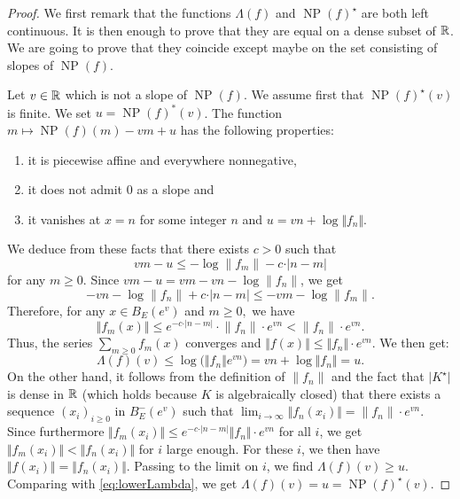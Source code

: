 \documentclass{lms}
\DeclareMathOperator{\NP}{NP}
\begin{document}
\begin{proof}
We first remark that the functions $\Lambda(f)$ and $\NP(f)^\star$ 
are both left continuous. It is then enough to prove that they are
equal on a dense subset of $\mathbb R$. We are going to prove that they
coincide except maybe on the set consisting of slopes of $\NP(f)$.

\smallskip

Let $v \in \mathbb R$ which is not a slope of $\NP(f)$. We assume first that 
$\NP(f)^\star(v)$ is finite. We set $u = \NP(f)^*(v)$. The 
function $m \mapsto \NP(f)(m) - vm + u$ has the following properties:
\begin{enumerate}
\item it is piecewise affine and everywhere nonnegative,
\item it does not admit $0$ as a slope and
\item it vanishes at $x = n$ for some integer $n$ and $u = vn + \log \Vert f_n \Vert$.
\end{enumerate}
We deduce from these facts that there exists $c>0$ such that 
\[
vm-u \leq - \log \lVert f_m \rVert - c \cdot \vert n-m \vert
\]
for any $m\geq 0$.
Since $vm-u=vm-vn-\log \lVert f_n \rVert$, we get 
\[
-vn-\log \lVert f_n \rVert + c \cdot \vert n-m \vert \leq -vm-\log \lVert f_m \rVert.
\]
Therefore, for any $x \in  B_E(e^v)$ and $m \geq 0,$ we have
\[
\Vert f_m (x) \Vert \leq e^{-c \cdot \vert n-m \vert } \cdot
\lVert f_n \rVert \cdot e^{vn}< \lVert f_n \rVert \cdot e^{vn}.
\]
Thus, the series $\sum_{m \geq 0} f_m(x)$ converges and $\Vert f(x) 
\Vert \leq \Vert f_n \Vert \cdot e^{vn}$. We then get:
\begin{equation}
\label{eq:lowerLambda}
\Lambda (f)(v) \leq \log \big( \Vert f_n \Vert e^{vn} \big)
= vn + \log \Vert f_n \Vert = u.
\end{equation}
On the other hand, it follows from the definition of $\lVert f_n \rVert$ 
and the fact that $\vert K^\star \vert$ is dense in $\mathbb R$ (which holds
because $K$ is algebraically closed)
that there exists a sequence $(x_i)_{i\geq 0}$ in $B^-_E(e^v)$ such that 
$\lim_{i \to \infty} \Vert f_n (x_i) \Vert= \lVert f_n \rVert \cdot e^{vn}$. Since 
furthermore $\Vert f_m (x_i) \Vert \leq e^{-c \cdot \vert n-m \vert} 
\Vert f_n \Vert \cdot e^{vn}$ for all $i$, we get $\Vert f_m (x_i) \Vert 
< \Vert f_n (x_i) \Vert$ for $i$ large enough. For these $i$, we then 
have $\Vert f(x_i) \Vert = \Vert f_n (x_i) \Vert$. Passing to the limit 
on $i$, we find $\Lambda (f)(v) \geq u$. Comparing with 
\eqref{eq:lowerLambda}, we get $\Lambda (f)(v) = u = 
\NP(f)^\star(v)$.


\end{proof}
\end{document}
